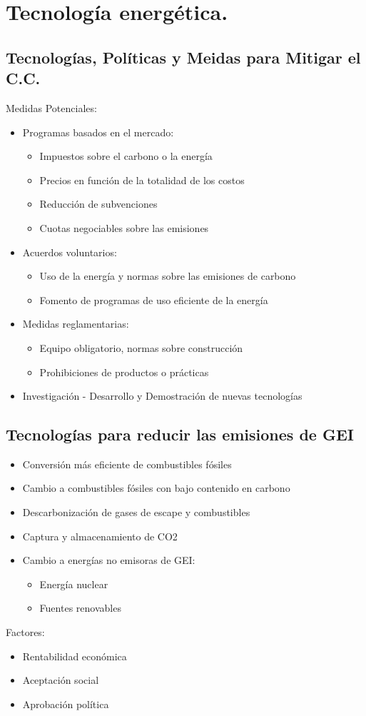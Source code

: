 \section{Tecnología energética.}
\subsection{Tecnologías, Políticas y Meidas para Mitigar el C.C.}
Medidas Potenciales:
\begin{itemize}
    \item Programas basados en el mercado:
    \begin{itemize}
        \item Impuestos sobre el carbono o la energía
        \item Precios en función de la totalidad de los costos
        \item Reducción de subvenciones
        \item Cuotas negociables sobre las emisiones
    \end{itemize}
    \item Acuerdos voluntarios:
    \begin{itemize}
        \item Uso de la energía y normas sobre las emisiones de carbono
        \item Fomento de programas de uso eficiente de la energía
    \end{itemize}
    \item Medidas reglamentarias:
    \begin{itemize}
        \item Equipo obligatorio, normas sobre construcción
        \item Prohibiciones de productos o prácticas
    \end{itemize}
    \item Investigación - Desarrollo y Demostración de nuevas tecnologías
\end{itemize}

\subsection{Tecnologías para reducir las emisiones de GEI}
\begin{itemize}
    \item Conversión más eficiente de combustibles fósiles
    \item Cambio a combustibles fósiles con bajo contenido en carbono
    \item Descarbonización de gases de escape y combustibles
    \item Captura y almacenamiento de CO2
    \item Cambio a energías no emisoras de GEI:
    \begin{itemize}
        \item Energía nuclear
        \item Fuentes renovables
    \end{itemize}
\end{itemize}

Factores:
\begin{itemize}
    \item Rentabilidad económica
    \item Aceptación social
    \item Aprobación política
\end{itemize}